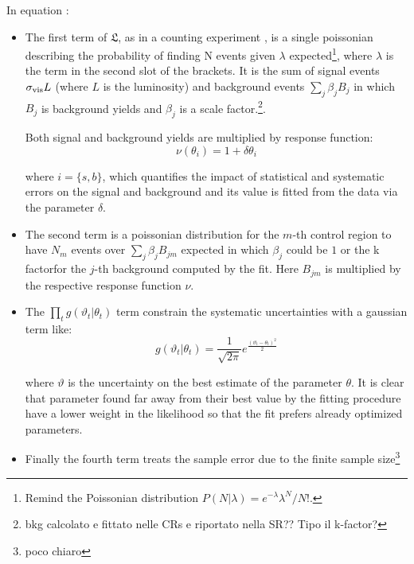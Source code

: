 In equation \Eqn{\ref{eqn:likelihood}}:
\begin{itemize}
\item The first term of $\mathfrak{L}$, as in a counting experiment , is a single poissonian describing the probability of finding N events given $\lambda$ expected\footnote{Remind the Poissonian distribution $P\left(N\vert\lambda\right)=e^{-\lambda}\lambda^N/N!$.}, where $\lambda$ is the term in the second slot of the brackets. It is the sum of signal events $\sigma_{\textup{vis}}L$ (where $L$ is the luminosity) and background events $\sum _j \beta_{j} B_{j}$ in which $B_{j}$ is background yields and $\beta_{j}$ is a scale factor.\footnote{bkg calcolato e fittato nelle CRs e riportato nella SR?? Tipo il k-factor?}.

  Both signal and background yields are multiplied by response function:
  \begin{equation}
    \nu(\theta_{i})  = 1 + \delta \theta_{i}
  \end{equation}
  
where $i=\{s,b\}$, which quantifies the impact of statistical and systematic errors on the signal and background and its value is fitted from the data via the parameter $\delta$. 
  
\item The second term is a poissonian distribution for the $m$-th control region to have $N_{m}$ events over $\sum _j \beta_{j} B_{jm}$ expected in which $\beta_{j}$ could be $1$ or the k factorfor the $j$-th background computed by the fit. Here $B_{jm}$ is multiplied by the respective response function $\nu$.
  
\item The $\prod _t g\left(\vartheta_{t} \vert \theta_{t}\right)$ term constrain the systematic uncertainties with a gaussian term like:
  \begin{equation}
    g(\vartheta_{t} \vert \theta_{t}) = \frac{1}{\sqrt{2\pi}}e^{\frac{(\vartheta_{t}-\theta_{t})^2}{2} } 
  \end{equation}
  
  where $\vartheta$ is the uncertainty on the best estimate of the parameter $\theta$. It is clear that parameter found far away from their best value by the fitting procedure have a lower weight in the likelihood so that the fit prefers already optimized parameters.
  
\item Finally the fourth term treats the sample error due to the finite sample size\footnote{poco chiaro}
\end{itemize}

